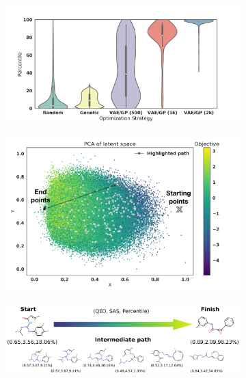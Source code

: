\begin{figure}
    \centering
	\begin{subfigure}{0.45\textwidth}
       \includegraphics[width=\textwidth]{fig4a_compare_violin.png}
    \end{subfigure}
    \vspace{1em}
	\begin{subfigure}{0.45\textwidth}
       \includegraphics[width=\textwidth]{fig4b_2k_opt.png} 
    \end{subfigure}
	\begin{subfigure}{\textwidth}
	    \includegraphics[width=\textwidth]{fig4c_interpolation_2.png} 
    \end{subfigure}

\end{figure}
